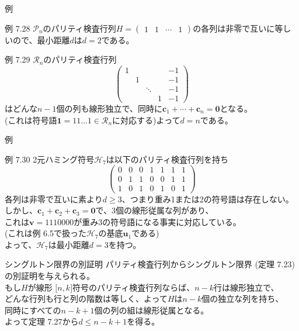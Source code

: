 \documentclass[dvipdfmx,10pt,jsarticle]{beamer}
\newcommand{\code}[1]{\mathcal{#1}}
\newcommand{\bracket}[1]{\lbrack{} #1 \rbrack}
\renewcommand{\vec}[1]{\mathbf{#1}}
\begin{document}
  \begin{frame}{例}
    \begin{block}{例 7.28}
      $\code{P}_n$のパリティ検査行列$H = \begin{pmatrix} 1 & 1 & \cdots & 1 \end{pmatrix}$の各列は非零で互いに等しいので、最小距離$d$は$d = 2$である。
    \end{block}
    \begin{block}{例 7.29}
      $\code{R}_n$のパリティ検査行列
      \[
        \begin{pmatrix}
          1 &   &   &   &  -1 \\
            & 1 &   &   &  -1 \\
            &   & \ddots &   & -1 \\
            &   &   & 1 & -1
        \end{pmatrix}
      \]
        はどんな$n-1$個の列も線形独立で、同時に$\vec{c}_1 + \cdots + \vec{c}_n = \vec{0}$となる。 \\ 
        (これは符号語$\vec{1} = 11\ldots 1 \in \code{R}_n$に対応する)よって$d = n$である。
    \end{block}
  \end{frame}
  \begin{frame}{例}
    \begin{block}{例 7.30}
      2元ハミング符号$\code{H}_7$は以下のパリティ検査行列を持ち
      \[ \begin{pmatrix}
          0 & 0 & 0 & 1 & 1 & 1 & 1 \\
          0 & 1 & 1 & 0 & 0 & 1 & 1 \\
          1 & 0 & 1 & 0 & 1 & 0 & 1 
      \end{pmatrix} \]
      各列は非零で互いに素より$d \geq 3$、つまり重み1または2の符号語は存在しない。 \\
      しかし、$\vec{c}_1 + \vec{c}_2 + \vec{c}_3 = \vec{0} $で、3個の線形従属な列があり、 \\
      これは$\vec{v} = 1110000$が重み3の符号語になる事実に対応している。 \\
      (これは例 6.5で扱った$\code{H}_7$の基底$\vec{u}_1$である) \\
      よって、$\code{H}_7$は最小距離$d = 3$を持つ。
    \end{block}
  \end{frame}

  \begin{frame}{シングルトン限界の別証明}
    パリティ検査行列からシングルトン限界 (定理 7.23)の別証明を与えられる。 \\
    もし$H$が線形 $\bracket{n, k}$符号のパリティ検査行列ならば、$n - k$行は線形独立で、\\
    どんな行列も行と列の階数は等しく、よって$H$は$n-k$個の独立な列を持ち、 \\
    同時にすべての$n - k + 1$個の列の組は線形従属となる。 \\
    よって定理 7.27から$d \leq n - k + 1$を得る。
  \end{frame}
\end{document}
